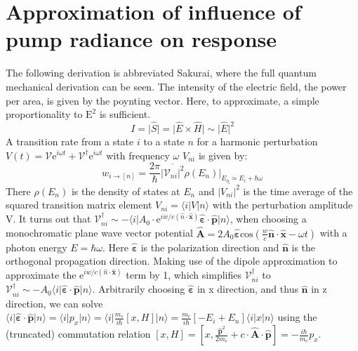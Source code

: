 \documentclass[twoside,openright]{scrreprt}
\begin{document}
\section{Approximation of influence of pump radiance on response}\label{deriv:RadianceResponse}
The following derivation is abbreviated Sakurai\cite[chapter 5.7-5.8]{Sakurai_Napolitano_2017}, where the full quantum mechanical derivation can be seen.
The intensity of the electric field, the power per area, is given by the poynting vector. Here, to approximate, a simple proportionality to  $\mathrm{E^2}$ is sufficient.
\begin{equation*}
I =  \lvert  \hat{S} \rvert =  \lvert \hat{E} \times \hat{H} \rvert  \sim \lvert \hat{E} \rvert^2
\end{equation*}
A transition rate from a state $i$ to a state $n$ for a harmonic  perturbation $V(t) = \mathcal{V}\mathrm{e}^{i\omega t} + \mathcal{V}^\dagger \mathrm{e}^{i\omega t}$ with frequency $\omega$ $V_{ni}$ is given by:\cite[chapter 5.7]{Sakurai_Napolitano_2017}
\begin{equation}\label{eq:transitionRate}
w_{i\rightarrow [n]} = \frac{2\pi}{\hbar}\overline{\lvert \mathcal{V}_{ni}\rvert^2}\rho(E_n)\vert_{E_n \simeq E_i + \hbar\omega}
\end{equation}
There $\rho(E_n)$ is the density of states at $E_n$ and $\overline{\lvert V_{ni}\rvert^2}$ is the time average of the squared transition matrix element $V_{ni} = \langle i\lvert V\rvert n \rangle$ with the perturbation amplitude V. %
It turns out that $\mathcal{V}^\dagger_{ni} \sim -\langle i\lvert A_0\cdot \mathrm{e}^{iw/c\left(\hat{n}\cdot\mathbf{\hat{x}}\right)} \mathbf{\hat{\varepsilon}}\cdot\mathbf{\hat{p}}\rvert n \rangle$, when choosing a monochromatic plane wave vector potential $\mathbf{\hat{A}} = 2A_0\mathbf{\hat{\varepsilon}}\mathrm{cos}\left(\frac{w}{c}\mathbf{\hat{n}\cdot \hat{x}}-\omega t\right)$ with a photon energy  $E =\hbar\omega$. Here $\mathbf{\hat{\varepsilon}}$ is the polarization direction and $\mathbf{\hat{n}}$ is the orthogonal propagation direction.\cite[chapter 5.7-5.8]{Sakurai_Napolitano_2017}
Making use of the dipole approximation to approximate the $\mathrm{e}^{iw/c\left(\hat{n}\cdot\mathbf{\hat{x}}\right)}$ term by 1, which simplifies $\mathcal{V}^\dagger_{ni}$ to $\mathcal{V}^\dagger_{ni} \sim -A_0\langle i\lvert \mathbf{\hat{\varepsilon}}\cdot\mathbf{\hat{p}}\rvert n \rangle$. Arbitrarily choosing $\mathbf{\hat{\varepsilon}}$ in x direction, and thus $\mathbf{\hat{n}}$ in z direction, we can solve $\langle i\lvert \mathbf{\hat{\varepsilon}}\cdot\mathbf{\hat{p}}\rvert n \rangle = \langle i\lvert p_x\rvert n \rangle = \langle i\lvert \frac{m_e}{i\hbar}\left[x,H\right]\rvert n \rangle = \frac{m_e}{i\hbar} \left[-E_i + E_n\right]\langle i\lvert x\rvert n \rangle$ using the (truncated) commutation relation $[x, H] = [x, \frac{\mathbf{\hat{p}}^2}{2m_e} + c\cdot\mathbf{\hat{A}}\cdot \mathbf{\hat{p}}] = -\frac{i\hbar}{m_e} p_x$.\\
\end{document}
